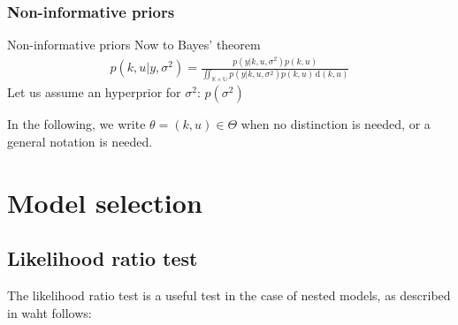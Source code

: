 \documentclass[a4paper,11pt]{article}
\theoremstyle{defi}
\numberwithin{thmCounter}{section}
\begin{document}
\subsubsection{Non-informative priors}
\label{sec:non-info_priors}
Non-informative priors 
Now to Bayes' theorem
\begin{align*}
  p(k,u | y,\sigma^2) = \frac{p(y | k, u, \sigma^2) p(k,u)}{\iint_{\mathbb{K}\times\mathbb{U}} p(y | k, u, \sigma^2) p(k,u) \, \mathrm{d}(k,u)}
\end{align*}
  Let us assume an hyperprior for $\sigma^2$: $p(\sigma^2)$

In the following, we write $\theta = (k, u)\in \Theta$ when no distinction is needed, or a general notation is needed.

\section{Model selection}
\label{sec:model_selection}

\subsection{Likelihood ratio test}
The likelihood ratio test is a useful test in the case of nested models, as described in waht follows:
\end{document}
